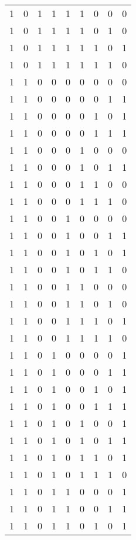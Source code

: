 \begin{longtable}[c]{rrrrrrrrr}
        1 & 0 & 1 & 1 & 1 & 1 & 0 & 0 & 0 \\
        1 & 0 & 1 & 1 & 1 & 1 & 0 & 1 & 0 \\
        1 & 0 & 1 & 1 & 1 & 1 & 1 & 0 & 1 \\
        1 & 0 & 1 & 1 & 1 & 1 & 1 & 1 & 0 \\
        1 & 1 & 0 & 0 & 0 & 0 & 0 & 0 & 0 \\
        1 & 1 & 0 & 0 & 0 & 0 & 0 & 1 & 1 \\
        1 & 1 & 0 & 0 & 0 & 0 & 1 & 0 & 1 \\
        1 & 1 & 0 & 0 & 0 & 0 & 1 & 1 & 1 \\
        1 & 1 & 0 & 0 & 0 & 1 & 0 & 0 & 0 \\
        1 & 1 & 0 & 0 & 0 & 1 & 0 & 1 & 1 \\
        1 & 1 & 0 & 0 & 0 & 1 & 1 & 0 & 0 \\
        1 & 1 & 0 & 0 & 0 & 1 & 1 & 1 & 0 \\
        1 & 1 & 0 & 0 & 1 & 0 & 0 & 0 & 0 \\
        1 & 1 & 0 & 0 & 1 & 0 & 0 & 1 & 1 \\
        1 & 1 & 0 & 0 & 1 & 0 & 1 & 0 & 1 \\
        1 & 1 & 0 & 0 & 1 & 0 & 1 & 1 & 0 \\
        1 & 1 & 0 & 0 & 1 & 1 & 0 & 0 & 0 \\
        1 & 1 & 0 & 0 & 1 & 1 & 0 & 1 & 0 \\
        1 & 1 & 0 & 0 & 1 & 1 & 1 & 0 & 1 \\
        1 & 1 & 0 & 0 & 1 & 1 & 1 & 1 & 0 \\
        1 & 1 & 0 & 1 & 0 & 0 & 0 & 0 & 1 \\
        1 & 1 & 0 & 1 & 0 & 0 & 0 & 1 & 1 \\
        1 & 1 & 0 & 1 & 0 & 0 & 1 & 0 & 1 \\
        1 & 1 & 0 & 1 & 0 & 0 & 1 & 1 & 1 \\
        1 & 1 & 0 & 1 & 0 & 1 & 0 & 0 & 1 \\
        1 & 1 & 0 & 1 & 0 & 1 & 0 & 1 & 1 \\
        1 & 1 & 0 & 1 & 0 & 1 & 1 & 0 & 1 \\
        1 & 1 & 0 & 1 & 0 & 1 & 1 & 1 & 0 \\
        1 & 1 & 0 & 1 & 1 & 0 & 0 & 0 & 1 \\
        1 & 1 & 0 & 1 & 1 & 0 & 0 & 1 & 1 \\
        1 & 1 & 0 & 1 & 1 & 0 & 1 & 0 & 1 \\

\end{longtable}
